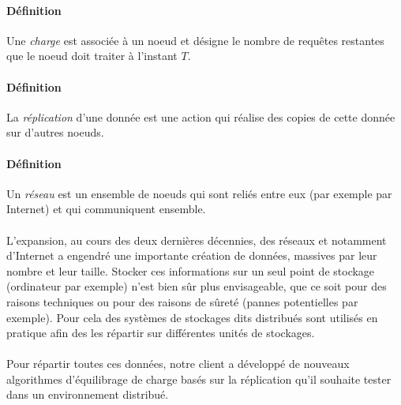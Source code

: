 \documentclass[12pt]{article}
\begin{document}



\paragraph{Définition} Une \textit{charge} est associée à un noeud et désigne le nombre de requêtes restantes que le noeud doit traiter à l'instant $T$.

\paragraph{Définition} La \textit{réplication} d'une donnée est une action qui réalise des copies de cette donnée sur d'autres noeuds.

\paragraph{Définition} Un \textit{réseau} est un ensemble de noeuds qui sont reliés entre eux (par exemple par Internet) et qui communiquent ensemble.

\paragraph{} L'expansion, au cours des deux dernières décennies, des réseaux et notamment d'Internet a engendré une importante création de données, massives par leur nombre et leur taille.
Stocker ces informations sur un seul point de stockage (ordinateur par exemple) n'est bien sûr plus envisageable, que ce soit pour des raisons techniques ou pour des raisons de sûreté (pannes potentielles par exemple).
Pour cela des systèmes de stockages dits distribués sont utilisés en pratique afin des les répartir sur différentes unités de stockages.

\paragraph{} Pour répartir toutes ces données, notre client a développé de nouveaux algorithmes d'équilibrage de charge basés sur la réplication qu'il souhaite tester dans un environnement distribué.
\end{document}
